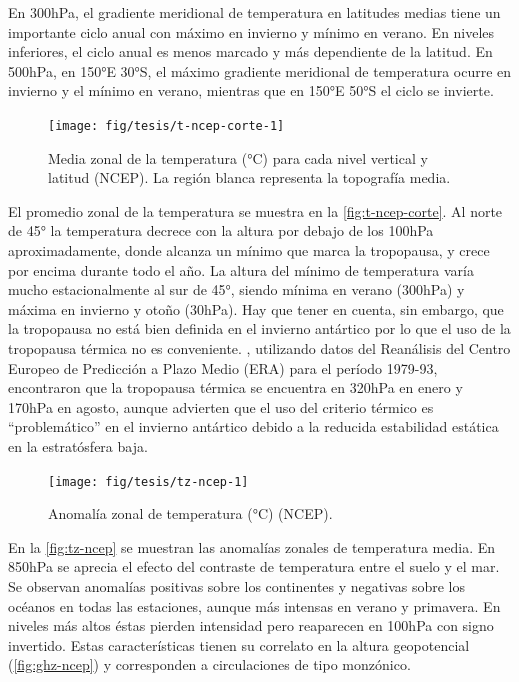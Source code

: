 \documentclass[spanish,a4paper,12pt,oneside]{book}
\begin{document}
En 300hPa, el gradiente meridional de temperatura en latitudes medias
tiene un importante ciclo anual con máximo en invierno y mínimo en
verano. En niveles inferiores, el ciclo anual es menos marcado y más
dependiente de la latitud. En 500hPa, en 150°E 30°S, el máximo gradiente
meridional de temperatura ocurre en invierno y el mínimo en verano,
mientras que en 150°E 50°S el ciclo se invierte.

\begin{figure}
\texttt{[image: fig/tesis/t-ncep-corte-1]} \caption{Media zonal de la temperatura (°C) para cada nivel vertical y latitud (NCEP). La región blanca representa la topografía media.}\label{fig:t-ncep-corte}
\end{figure}

El promedio zonal de la temperatura se muestra en la
\autoref{fig:t-ncep-corte}. Al norte de 45° la temperatura decrece con
la altura por debajo de los 100hPa aproximadamente, donde alcanza un
mínimo que marca la tropopausa, y crece por encima durante todo el año.
La altura del mínimo de temperatura varía mucho estacionalmente al sur
de 45°, siendo mínima en verano (300hPa) y máxima en invierno y otoño
(30hPa). Hay que tener en cuenta, sin embargo, que la tropopausa no está
bien definida en el invierno antártico \citep{Court1942, Zangl2001} por
lo que el uso de la tropopausa térmica no es conveniente.
\citet{Zangl2001}, utilizando datos del Reanálisis del Centro Europeo de
Predicción a Plazo Medio (ERA) para el período 1979-93, encontraron que
la tropopausa térmica se encuentra en 320hPa en enero y 170hPa en
agosto, aunque advierten que el uso del criterio térmico es
``problemático'' en el invierno antártico debido a la reducida
estabilidad estática en la estratósfera baja.

\begin{landscape}\begin{figure}

{\centering \texttt{[image: fig/tesis/tz-ncep-1]} 

}

\caption{Anomalía zonal de temperatura (°C) (NCEP).}\label{fig:tz-ncep}
\end{figure}
\end{landscape}

En la \autoref{fig:tz-ncep} se muestran las anomalías zonales de
temperatura media. En 850hPa se aprecia el efecto del contraste de
temperatura entre el suelo y el mar. Se observan anomalías positivas
sobre los continentes y negativas sobre los océanos en todas las
estaciones, aunque más intensas en verano y primavera. En niveles más
altos éstas pierden intensidad pero reaparecen en 100hPa con signo
invertido. Estas características tienen su correlato en la altura
geopotencial (\autoref{fig:ghz-ncep}) y corresponden a circulaciones de
tipo monzónico.
\end{document}
